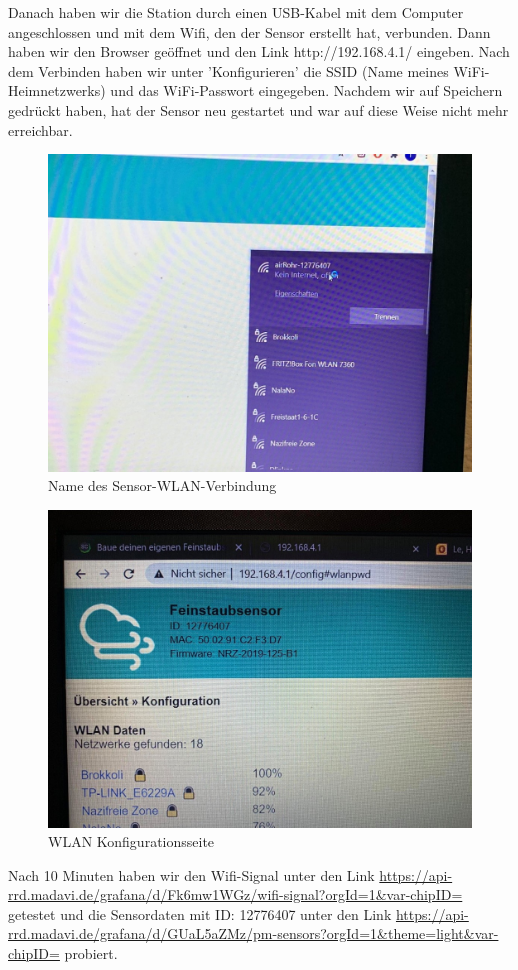 \documentclass[draft=false
              ,paper=a4
              ,twoside=false
              ,fontsize=10pt
              ,headsepline
              ,BCOR10mm
              ,DIV11
              ]{article}
\begin{document}
Danach haben wir die Station durch einen USB-Kabel mit dem Computer angeschlossen und mit dem Wifi, den der Sensor erstellt hat, verbunden. Dann haben wir den Browser geöffnet und den Link http://192.168.4.1/ eingeben. Nach dem Verbinden haben wir unter 'Konfigurieren' die SSID (Name meines WiFi-Heimnetzwerks) und das WiFi-Passwort eingegeben. Nachdem wir auf Speichern gedrückt haben, hat der Sensor neu gestartet und war auf diese Weise nicht mehr erreichbar.

\begin{figure}[H]
  \centering
  \includegraphics[width=0.8\linewidth]{WLAN}
  \caption{Name des Sensor-WLAN-Verbindung}
\end{figure}

\begin{figure}[H]
  \centering
  \includegraphics[width=0.8\linewidth]{konfigurationsseite}
  \caption{WLAN Konfigurationsseite }
\end{figure}

Nach 10 Minuten haben wir den Wifi-Signal unter den Link \url{https://api-rrd.madavi.de/grafana/d/Fk6mw1WGz/wifi-signal?orgId=1&var-chipID=} getestet und die Sensordaten mit ID: 12776407 unter den Link \url{https://api-rrd.madavi.de/grafana/d/GUaL5aZMz/pm-sensors?orgId=1&theme=light&var-chipID=} probiert. 
\end{document}
